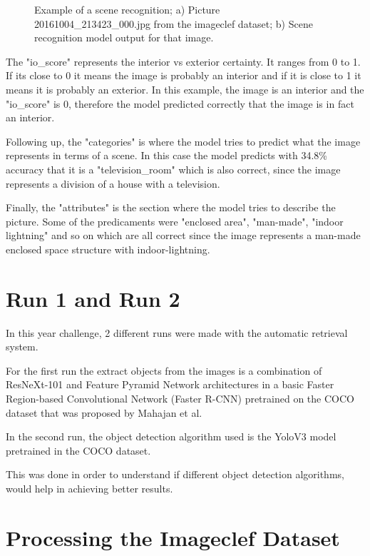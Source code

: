\begin{figure}[H]
\begin{subfigure}{0.4\textwidth}
    \caption{}
    \end{subfigure}
    
    \caption{Example of a scene recognition; a) Picture 20161004\_213423\_000.jpg from the imageclef dataset; b) Scene recognition model output for that image.}

    \label{fig:imagea}
    \end{figure}


    The "io\_score" represents the interior vs exterior certainty. It ranges from 0 to 1. If its close to 0 it means the image is probably an interior and if it is close to 1 it means it is probably an exterior. In this example, the image is an interior and the "io\_score" is 0, therefore the model predicted correctly that the image is in fact an interior.

    Following up, the "categories" is where the model tries to predict what the image represents in terms of a scene. In this case the model predicts with 34.8\% accuracy that it is a "television\_room" which is also correct, since the image represents a division of a house with a television.

    Finally, the "attributes" is the section where the model tries to describe the picture. Some of the predicaments were "enclosed area", "man-made", "indoor lightning" and so on which are all correct since the image represents a man-made enclosed space structure with indoor-lightning.

\section{Run  1 and Run 2}
    In this year challenge, 2 different runs were made with the automatic retrieval system. 
    
    For the first run the extract objects from the images is a combination of ResNeXt-101 and Feature Pyramid Network architectures in a basic Faster Region-based Convolutional Network (Faster R-CNN) pretrained on the COCO dataset that was proposed by Mahajan et al. \cite{Mahajan2018}
    
    In the second run, the object detection algorithm used is the YoloV3 \cite{Redmon2018} model pretrained in the COCO dataset. 

    This was done in order to understand if different object detection algorithms, would help in achieving better results.

\section{Processing the Imageclef Dataset}
\label{sec:process_dataset}

